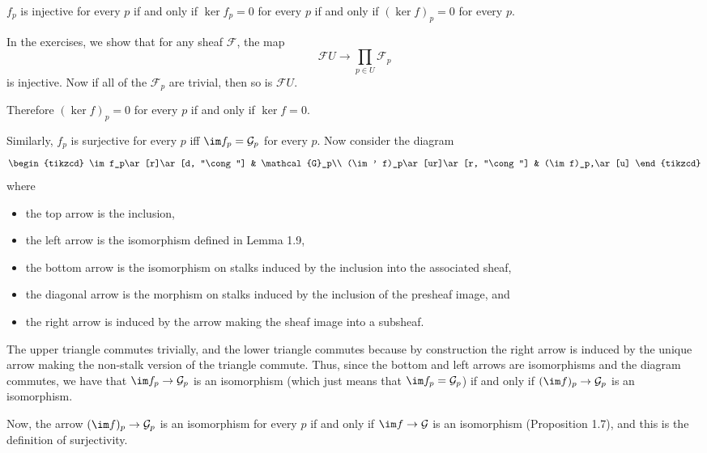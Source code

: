 $f_p$ is injective for every $p$ if and only if $\ker f_p = 0$ for every $p$
if and only if $(\ker f)_p = 0$ for every $p$.

In the exercises, we show that for any sheaf $\mathcal{F}$, the map
\[ \mathcal{F}U \to \prod_{p \in U} \mathcal{F}_p \]
is injective. Now if all of the $\mathcal{F}_p$ are trivial, then so is
$\mathcal{F}U$.

Therefore $(\ker f)_p = 0$ for every $p$ if and only if $\ker f = 0$.

Similarly, $f_p$ is surjective for every $p$ iff $\im f_p = \mathcal{G}_p$ for every $p$.
Now consider the diagram
\[\begin{tikzcd}
	\im f_p\ar[r]\ar[d, "\cong"] & \mathcal{G}_p\\
	(\im' f)_p\ar[ur]\ar[r, "\cong"] & (\im f)_p,\ar[u]
\end{tikzcd}\]
where
\begin{itemize}
	\item the top arrow is the inclusion,
	\item the left arrow is the isomorphism defined in Lemma 1.9,
	\item the bottom arrow is the isomorphism on stalks induced by the inclusion into
		the associated sheaf,
	\item the diagonal arrow is the morphism on stalks induced by the inclusion of
		the presheaf image, and
	\item the right arrow is induced by the arrow making the sheaf image into a
		subsheaf.
\end{itemize}

The upper triangle commutes trivially, and the lower triangle commutes because
by construction the right arrow is induced by the unique arrow making the non-stalk
version of the triangle commute.
Thus, since the bottom and left arrows are isomorphisms and the diagram commutes,
we have that $\im f_p \to \mathcal{G}_p$ is an isomorphism (which just means that
$\im f_p = \mathcal{G}_p$) if and only if
$(\im f)_p \to \mathcal{G}_p$ is an isomorphism.

Now, the arrow $(\im f)_p \to \mathcal{G}_p$ is an isomorphism for every $p$ if
and only if $\im f \to \mathcal{G}$ is an isomorphism (Proposition 1.7), and this
is the definition of surjectivity.
